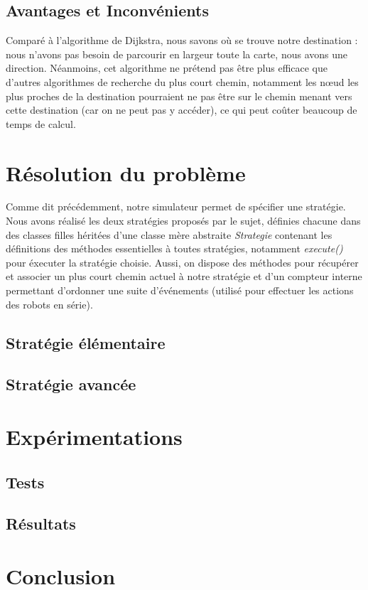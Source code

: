 \documentclass[a4paper, 10pt, french]{article}
\begin{document}
	\subsection{Avantages et Inconvénients}

	Comparé à l'algorithme de Dijkstra, nous savons où se trouve notre destination : nous n'avons pas besoin de parcourir en largeur toute la carte, nous avons une direction. Néanmoins, cet algorithme ne prétend pas être plus efficace que d'autres algorithmes de recherche du plus court chemin, notamment les nœud les plus proches de la destination pourraient ne pas être sur le chemin menant vers cette destination (car on ne peut pas y accéder), ce qui peut coûter beaucoup de temps de calcul.

\section{Résolution du problème}

	Comme dit précédemment, notre simulateur permet de spécifier une stratégie. Nous avons réalisé les deux stratégies proposés par le sujet, définies chacune dans des classes filles héritées d'une classe mère abstraite {\it Strategie} contenant les définitions des méthodes essentielles à toutes stratégies, notamment {\it execute()} pour éxecuter la stratégie choisie. Aussi, on dispose des méthodes pour récupérer et associer un plus court chemin actuel à notre stratégie et d'un compteur interne permettant d'ordonner une suite d'événements (utilisé pour effectuer les actions des robots en série). 

	\subsection{Stratégie élémentaire}
		

	\subsection{Stratégie avancée}

\section{Expérimentations}

	\subsection{Tests}

	\subsection{Résultats}

\section{Conclusion}
\end{document}
